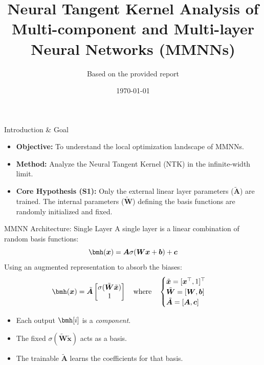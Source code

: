 \documentclass{beamer}
\title{Neural Tangent Kernel Analysis of Multi-component and Multi-layer Neural Networks (MMNNs)}
\author{Based on the provided report}
\date{\today}
\begin{document}
\begin{frame}
\titlepage
\end{frame}

\begin{frame}{Introduction \& Goal}
\begin{itemize}
    \item \textbf{Objective:} To understand the local optimization landscape of MMNNs.
    \item \textbf{Method:} Analyze the Neural Tangent Kernel (NTK) in the infinite-width limit.
    \item \textbf{Core Hypothesis (S1):} Only the external linear layer parameters ($\tilde{\bm{A}}$) are trained. The internal parameters ($\tilde{\bm{W}}$) defining the basis functions are randomly initialized and fixed.
\end{itemize}
\end{frame}

\begin{frame}{MMNN Architecture: Single Layer}
A single layer is a linear combination of random basis functions:
\begin{equation*}
    \bmh(\bm{x}) = \bm{A} \sigma(\bm{W}\bm{x} + \bm{b}) + \bm{c}
\end{equation*}
\vspace{1em}
Using an augmented representation to absorb the biases:
\begin{equation*}
    \bmh(\bm{x}) = \tilde{\bm{A}}
    \begin{bmatrix}
        \sigma(\tilde{\bm{W}}\tilde{\bm{x}}) \\
        1
    \end{bmatrix}
    \quad \text{where} \quad
    \begin{cases}
      \tilde{\bm{x}} = [\bm{x}^{\top}, 1]^{\top} \\
      \tilde{\bm{W}} = [\bm{W}, \bm{b}] \\
      \tilde{\bm{A}} = [\bm{A}, \bm{c}]
    \end{cases}
\end{equation*}
\begin{itemize}
    \item Each output $\bmh[i]$ is a \textit{component}.
    \item The fixed $\sigma(\tilde{\bm{W}}\tilde{\bm{x}})$ acts as a basis.
    \item The trainable $\tilde{\bm{A}}$ learns the coefficients for that basis.
\end{itemize}
\end{frame}
\end{document}
